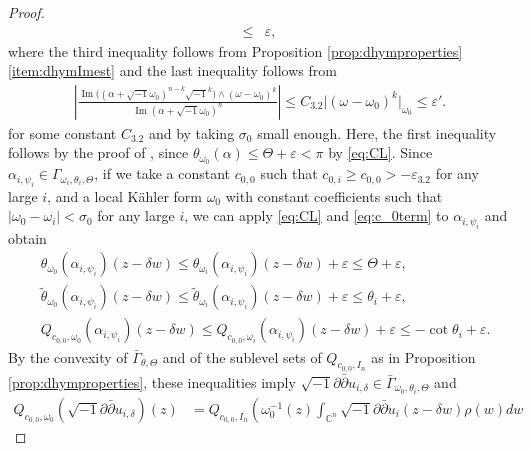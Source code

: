 \documentclass[10pt,a4paper]{amsart}
\numberwithin{equation}{section}
\newcommand{\delb}{\sqrt{-1}\partial\bar{\partial}}
\begin{document}
\begin{proof}
\begin{equation}
\begin{aligned}
        \le&\varepsilon,
    \end{aligned}
    \end{equation}
    where the third inequality follows from Proposition \ref{prop:dhymproperties} \ref{item:dhymImest} and the last inequality follows from
    \begin{align*}
        \left\vert\frac{\operatorname{Im}\big((\alpha+\sqrt{-1}\omega_0)^{n-k}\sqrt{-1}^k\big)\wedge(\omega-\omega_0)^k}{\operatorname{Im}(\alpha+\sqrt{-1}\omega_0)^n}\right\vert\le C_{3.2}\vert(\omega-\omega_0)^k\vert_{\omega_0}\le\varepsilon'.
    \end{align*}
    for some constant $C_{3.2}$ and by taking $\sigma_0$ small enough. Here, the first inequality follows by the proof of \cite[Lemma 5.6 (1)]{GChen}, since $\theta_{\omega_0}(\alpha)\le\Theta+\varepsilon<\pi$ by \eqref{eq:CL}.
    Since $\alpha_{i,\psi_i}\in\Gamma_{\omega_i,\theta_i,\Theta}$, if we take a constant $c_{0,0}$ such that $c_{0,i}\ge c_{0,0}>-\varepsilon_{3.2}$ for any large $i$, and a local Kähler form $\omega_0$ with constant coefficients such that $\vert\omega_0-\omega_i\vert<\sigma_0$ for any large $i$, we can apply \eqref{eq:CL} and \eqref{eq:c_0term} to $\alpha_{i,\psi_i}$ and obtain 
    \begin{equation}\label{eq:deltamono}
        \begin{aligned}
            &{\theta}_{\omega_0}(\alpha_{i,\psi_i})(z-\delta w)\le {\theta}_{\omega_i}(\alpha_{i,\psi_i})(z-\delta w)+\varepsilon\le\Theta+\varepsilon,\\
            &\tilde{\theta}_{\omega_0}(\alpha_{i,\psi_i})(z-\delta w)\le \tilde{\theta}_{\omega_i}(\alpha_{i,\psi_i})(z-\delta w)+\varepsilon\le\theta_i+\varepsilon,\\
            &Q_{c_{0,0},\omega_0}(\alpha_{i,\psi_i})(z-\delta w)\le Q_{c_{0,0},\omega_i}(\alpha_{i,\psi_i})(z-\delta w)+\varepsilon\le-\cot\theta_i+\varepsilon.
        \end{aligned}
    \end{equation}
    By the convexity of $\bar{\Gamma}_{\theta,\Theta}$ and of the sublevel sets of $Q_{c_{0,0},I_n}$ as in Proposition \ref{prop:dhymproperties}, these inequalities imply $\delb u_{i,\delta}\in\bar{\Gamma}_{\omega_0,\theta_i,\Theta}$ and
    \begin{equation*}\label{eq:dhymQconv}
        \begin{split}
        Q_{c_{0,0},\omega_0}(\delb u_{i,\delta})(z)
        &=Q_{c_{0,0},I_n}\left(\omega^{-1}_0(z) \int_{\mathbb{C}^n}\delb u_{i}(z-\delta w)\rho(w)dw

\end{split}
\end{equation*}
\end{proof}
\end{document}
